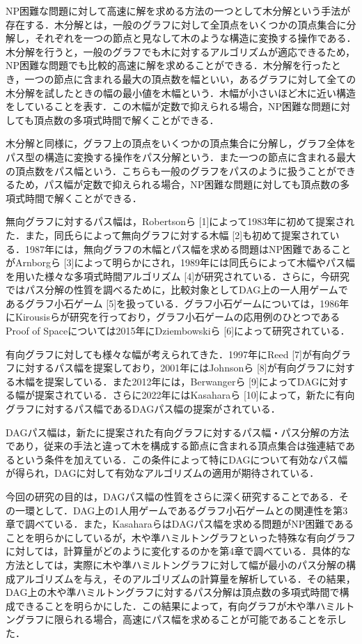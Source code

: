 \documentclass{kuisthesis}           %
\begin{document}
NP困難な問題に対して高速に解を求める方法の一つとして木分解という手法が存在する．木分解とは，一般のグラフに対して全頂点をいくつかの頂点集合に分解し，それぞれを一つの節点と見なして木のような構造に変換する操作である．木分解を行うと，一般のグラフでも木に対するアルゴリズムが適応できるため，NP困難な問題でも比較的高速に解を求めることができる．木分解を行ったとき，一つの節点に含まれる最大の頂点数を幅といい，あるグラフに対して全ての木分解を試したときの幅の最小値を木幅という．木幅が小さいほど木に近い構造をしていることを表す．この木幅が定数で抑えられる場合，NP困難な問題に対しても頂点数の多項式時間で解くことができる．

木分解と同様に，グラフ上の頂点をいくつかの頂点集合に分解し，グラフ全体をパス型の構造に変換する操作をパス分解という．また一つの節点に含まれる最大の頂点数をパス幅という．こちらも一般のグラフをパスのように扱うことができるため，パス幅が定数で抑えられる場合，NP困難な問題に対しても頂点数の多項式時間で解くことができる．


無向グラフに対するパス幅は，Robertsonら [1]によって1983年に初めて提案された．また，同氏らによって無向グラフに対する木幅 [2]も初めて提案されている．1987年には，無向グラフの木幅とパス幅を求める問題はNP困難であることがArnborgら [3]によって明らかにされ，1989年には同氏らによって木幅やパス幅を用いた様々な多項式時間アルゴリズム [4]が研究されている．さらに，今研究ではパス分解の性質を調べるために，比較対象としてDAG上の一人用ゲームであるグラフ小石ゲーム [5]を扱っている．グラフ小石ゲームについては，1986年にKirousisらが研究を行っており，グラフ小石ゲームの応用例のひとつであるProof of Spaceについては2015年にDziembowskiら [6]によって研究されている．

有向グラフに対しても様々な幅が考えられてきた．1997年にReed [7]が有向グラフに対するパス幅を提案しており，2001年にはJohnsonら [8]が有向グラフに対する木幅を提案している．また2012年には，Berwangerら [9]によってDAGに対する幅が提案されている．さらに2022年にはKasaharaら [10]によって，新たに有向グラフに対するパス幅であるDAGパス幅の提案がされている．

DAGパス幅は，新たに提案された有向グラフに対するパス幅・パス分解の方法であり，従来の手法と違って木を構成する節点に含まれる頂点集合は強連結であるという条件を加えている．この条件によって特にDAGについて有効なパス幅が得られ，DAGに対して有効なアルゴリズムの適用が期待されている．

今回の研究の目的は，DAGパス幅の性質をさらに深く研究することである．その一環として．DAG上の1人用ゲームであるグラフ小石ゲームとの関連性を第3章で調べている．また，KasaharaらはDAGパス幅を求める問題がNP困難であることを明らかにしているが，木や準ハミルトングラフといった特殊な有向グラフに対しては，計算量がどのように変化するのかを第4章で調べている．具体的な方法としては，実際に木や準ハミルトングラフに対して幅が最小のパス分解の構成アルゴリズムを与え，そのアルゴリズムの計算量を解析している．その結果，DAG上の木や準ハミルトングラフに対するパス分解は頂点数の多項式時間で構成できることを明らかにした．この結果によって，有向グラフが木や準ハミルトングラフに限られる場合，高速にパス幅を求めることが可能であることを示した．
\end{document}
